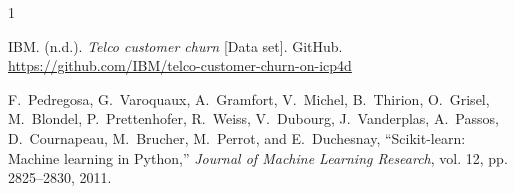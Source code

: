 \documentclass{article} %
\begin{document}
\vspace{1em}


\begin{thebibliography}{1}

IBM. (n.d.). \emph{Telco customer churn} [Data set]. GitHub. \url{https://github.com/IBM/telco-customer-churn-on-icp4d}

F.~Pedregosa, G.~Varoquaux, A.~Gramfort, V.~Michel, B.~Thirion, O.~Grisel, M.~Blondel, P.~Prettenhofer, R.~Weiss, V.~Dubourg, J.~Vanderplas, A.~Passos, D.~Cournapeau, M.~Brucher, M.~Perrot, and E.~Duchesnay, ``Scikit-learn: Machine learning in Python,'' \emph{Journal of Machine Learning Research}, vol. 12, pp. 2825--2830, 2011.

\end{thebibliography}
\end{document}
